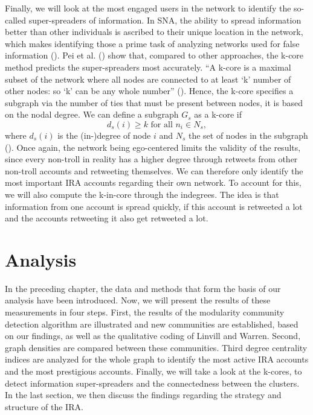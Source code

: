 \documentclass[12pt, titlepage=true, toc=bib]{scrartcl}
\begin{document}
Finally, we will look at the most engaged users in the network to identify the so-called super-spreaders of information. In SNA, the ability to spread information better than other individuals is ascribed to their unique location in the network, which makes identifying those a prime task of analyzing networks used for false information (\cite[1]{pei_searching_2015}). Pei et al. (\cite*{pei_searching_2015}) show that, compared to other approaches, the k-core method predicts the super-spreaders most accurately. \enquote{A k-core is a maximal subset of the network where all nodes are connected to at least \enquote{k} number of other nodes: so \enquote{k} can be any whole number} (\cite[983]{golovchenko_state_2018}). Hence, the k-core specifies a subgraph via the number of ties that must be present between nodes, it is based on the nodal degree. We can define a subgraph \( G_{s} \) as a k-core if \[ d_{s}(i) \geq k \text{ for all } n_{i} \in N_{s} ,\] where \( d_{s}(i) \) is the (in-)degree of node \( i \) and \( N_{s} \) the set of nodes in the subgraph (\cite[266]{wasserman_social_1994}). Once again, the network being ego-centered limits the validity of the results, since every non-troll in reality has a higher degree through retweets from other non-troll accounts and retweeting themselves. We can therefore only identify the most important IRA accounts regarding their own network. To account for this, we will also compute the k-in-core through the indegrees. The idea is that information from one account is spread quickly, if this account is retweeted a lot and the accounts retweeting it also get retweeted a lot.

\section{Analysis}

In the preceding chapter, the data and methods that form the basis of our analysis have been introduced. Now, we will present the results of these measurements in four steps. First, the results of the modularity community detection algorithm are illustrated and new communities are established, based on our findings, as well as the qualitative coding of Linvill and Warren. Second, graph densities are compared between these communities. Third degree centrality indices are analyzed for the whole graph to identify the most active IRA accounts and the most prestigious accounts. Finally, we will take a look at the k-cores, to detect information super-spreaders and the connectedness between the clusters. In the last section, we then discuss the findings regarding the strategy and structure of the IRA.
\end{document}
